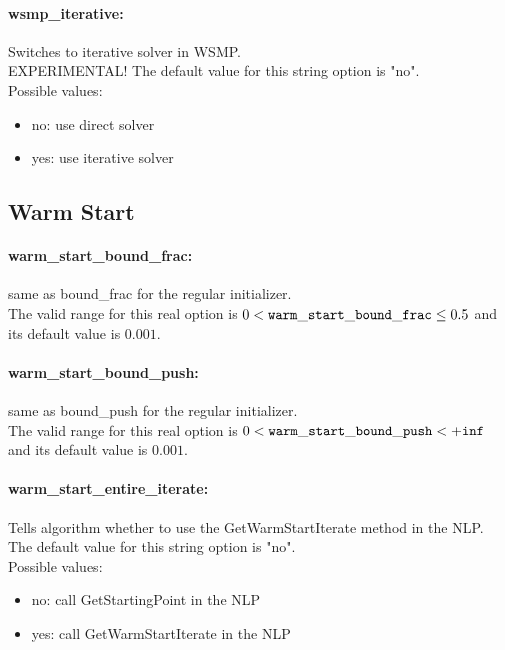 \paragraph{wsmp\_iterative:}\label{sec:wsmp_iterative} Switches to iterative solver in WSMP. $\;$ \\
 EXPERIMENTAL!
The default value for this string option is "no".
\\ 
Possible values:
\begin{itemize}
   \item no: use direct solver
   \item yes: use iterative solver
\end{itemize}

\subsection{Warm Start}
\label{sec:Warm_Start}
\paragraph{warm\_start\_bound\_frac:}\label{sec:warm_start_bound_frac} same as bound\_frac for the regular initializer. $\;$ \\
 The valid range for this real option is 
$0 <  {\tt warm\_start\_bound\_frac } \le 0.5$
and its default value is $0.001$.


\paragraph{warm\_start\_bound\_push:}\label{sec:warm_start_bound_push} same as bound\_push for the regular initializer. $\;$ \\
 The valid range for this real option is 
$0 <  {\tt warm\_start\_bound\_push } <  {\tt +inf}$
and its default value is $0.001$.


\paragraph{warm\_start\_entire\_iterate:}\label{sec:warm_start_entire_iterate} Tells algorithm whether to use the GetWarmStartIterate method in the NLP. $\;$ \\

The default value for this string option is "no".
\\ 
Possible values:
\begin{itemize}
   \item no: call GetStartingPoint in the NLP
   \item yes: call GetWarmStartIterate in the NLP
\end{itemize}


